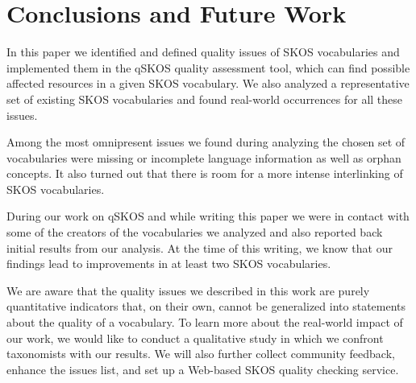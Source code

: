 \section{Conclusions and Future Work}\label{sec:conclusions}

In this paper we identified and defined quality issues of SKOS vocabularies and implemented them in the qSKOS quality assessment tool, which can find possible affected resources in a given SKOS vocabulary. We also analyzed a representative set of existing SKOS vocabularies and found real-world occurrences for all these issues. 

Among the most omnipresent issues we found during analyzing the chosen set of vocabularies were missing or incomplete language information as well as orphan concepts. It also turned out that there is room for a more intense interlinking of SKOS vocabularies.

During our work on qSKOS and while writing this paper we were in contact with some of the creators of the vocabularies we analyzed and also reported back initial results from our analysis. At the time of this writing, we know that our findings lead to improvements in at least two SKOS vocabularies.

We are aware that the quality issues we described in this work are purely quantitative indicators that, on their own, cannot be generalized into statements about the quality of a vocabulary. To learn more about the real-world impact of our work, we would like to conduct a qualitative study in which we confront taxonomists with our results. We will also further collect community feedback, enhance the issues list, and set up a Web-based SKOS quality checking service.



